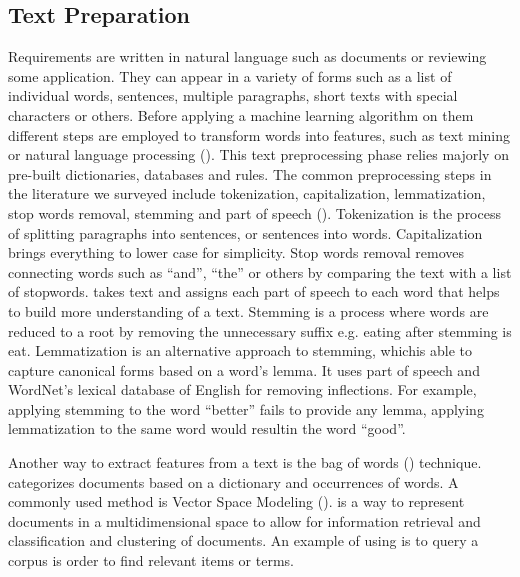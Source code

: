 \subsection{Text Preparation}
\label{sec:preprocessing}

Requirements are written in natural language such as documents or reviewing some
application. They can appear in a variety of forms such as a list of
individual words, sentences, multiple paragraphs, short texts with
special characters or others. Before applying a machine learning algorithm on
them different steps are employed to transform words  into
features, such as text mining or natural language processing (\NLP). This text preprocessing phase
relies majorly on pre-built dictionaries, databases and rules. The common
preprocessing steps in the literature we surveyed include
tokenization, capitalization, lemmatization, stop words removal, stemming and
part of speech (\POS). Tokenization is the process of splitting paragraphs into sentences, or
sentences into words. Capitalization brings everything to lower case for
simplicity. Stop words removal removes connecting words such as ``and'', ``the'' or others by
comparing the text with a list of stopwords. \POS takes text and assigns each
part of speech to each word that helps to build more understanding of a
text. Stemming is a process where words are reduced to a root by
removing the unnecessary suffix e.g. eating after stemming is eat. Lemmatization is an
alternative approach to stemming, whichis able to capture canonical forms based
on a word's lemma. It uses part of speech and WordNet’s lexical database of
English for removing inflections. For example, applying
stemming to the word ``better'' fails to provide any lemma, applying
lemmatization to the same word would resultin the word ``good''.

 Another way to extract features from a text is the bag of words (\BOW)
 technique. \BOW categorizes documents based on a dictionary and occurrences of
 words. A commonly used \BOW method is Vector Space Modeling
 (\VSM). \VSM is a way to represent documents in a multidimensional space to
 allow for information retrieval and classification and clustering of documents.
 An example of using \VSM is to query a corpus is order to find relevant items
 or terms.

